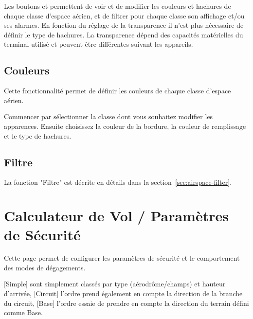 Les boutons   et  permettent de voir et de modifier les couleurs et hachures  de chaque classe d'espace aérien, et de filtrer pour chaque classe son affichage et/ou ses alarmes. En fonction du réglage de la transparence il n'est plus nécessaire de définir le type de hachures. La transparence dépend des capacités matérielles du terminal utilisé et peuvent être différentes suivant les appareils. 

\subsection*{Couleurs}
Cette fonctionnalité permet de définir les couleurs de chaque classe d'espace aérien.

Commencer par sélectionner la classe dont vous souhaitez modifier les apparences. Ensuite choisissez la couleur de la bordure, la couleur de remplissage et le type de hachures.

\subsection*{Filtre}
La fonction "Filtre" est décrite en détails dans la section~\ref{sec:airspace-filter}.

\section{Calculateur de Vol / Paramètres de Sécurité}\label{sec:secu-parameter}

Cette page permet de configurer les paramètres de sécurité et le comportement des modes de dégagements.


[Simple] sont simplement classés par type (aérodrôme/champs) et hauteur d'arrivée,
[Circuit] l'ordre prend également en compte la direction de la branche du circuit,
[Base] l'ordre essaie de prendre en compte la direction du terrain défini comme Base.


